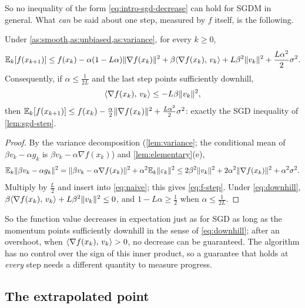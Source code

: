 So no inequality of the form \eqref{eq:intro-sgd-decrease} can hold for SGDM in general.
What \emph{can} be said about one step, measured by $f$ itself, is the following.

\begin{proposition}\label{prop:f-step}
Under \cref{as:smooth,as:unbiased,as:variance}, for every $k\ge0$,
\begin{equation}\label{eq:f-step}
  \mathbb{E}_k[f(x_{k+1})]\le f(x_k)-\alpha(1-L\alpha)\lVert \nabla f(x_k)\rVert^2
  +\beta\langle \nabla f(x_k),\, v_k\rangle+L\beta^2\lVert v_k\rVert^2+\frac{L\alpha^2}{2}\sigma^2 .
\end{equation}
Consequently, if $\alpha\le\frac1{2L}$ and the last step points sufficiently downhill,
\begin{equation}\label{eq:downhill}
  \langle \nabla f(x_k),\, v_k\rangle\le-L\beta\lVert v_k\rVert^2,
\end{equation}
then $\mathbb{E}_k[f(x_{k+1})]\le f(x_k)-\frac\alpha2\lVert \nabla f(x_k)\rVert^2+\frac{L\alpha^2}{2}\sigma^2$:
exactly the SGD inequality of \cref{lem:sgd-step}.
\end{proposition}

\begin{proof}
By the variance decomposition (\cref{lem:variance}; the conditional mean of
$\beta v_k-\alpha g_k$ is $\beta v_k-\alpha\nabla f(x_k)$) and \cref{lem:elementary}(e),
\[
  \mathbb{E}_k\lVert \beta v_k-\alpha g_k\rVert^2=\lVert \beta v_k-\alpha\nabla f(x_k)\rVert^2+\alpha^2\mathbb{E}_k\lVert \varepsilon_k\rVert^2
  \le2\beta^2\lVert v_k\rVert^2+2\alpha^2\lVert \nabla f(x_k)\rVert^2+\alpha^2\sigma^2 .
\]
Multiply by $\frac L2$ and insert into \eqref{eq:naive}; this gives \eqref{eq:f-step}. Under
\eqref{eq:downhill}, $\beta\langle \nabla f(x_k),\, v_k\rangle+L\beta^2\lVert v_k\rVert^2\le0$, and
$1-L\alpha\ge\frac12$ when $\alpha\le\frac1{2L}$.
\end{proof}

So the function value decreases in expectation just as for SGD as long as the momentum
points sufficiently downhill in the sense of \eqref{eq:downhill}; after an overshoot, when $\langle \nabla f(x_k),\, v_k\rangle>0$, no decrease can
be guaranteed. The algorithm has no control over the sign of this inner product, so a
guarantee that holds at \emph{every} step needs a different quantity to measure progress.

\subsection{The extrapolated point}\label{sec:extrapolated}

